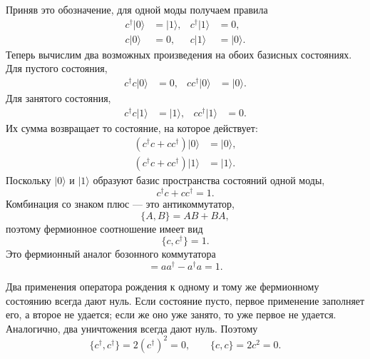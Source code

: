 Приняв это обозначение, для одной моды получаем правила
\begin{align}
c^\dagger|0\rangle&=|1\rangle,
&c^\dagger|1\rangle&=0,
\\
c|0\rangle&=0,
&c|1\rangle&=|0\rangle.
\end{align}
Теперь вычислим два возможных произведения на обоих базисных состояниях. Для пустого состояния,
\begin{align}
c^\dagger c|0\rangle&=0,
&
cc^\dagger|0\rangle&=|0\rangle.
\end{align}
Для занятого состояния,
\begin{align}
c^\dagger c|1\rangle&=|1\rangle,
&
cc^\dagger|1\rangle&=0.
\end{align}
Их сумма возвращает то состояние, на которое действует:
\begin{align}
(c^\dagger c+cc^\dagger)|0\rangle&=|0\rangle,
\\
(c^\dagger c+cc^\dagger)|1\rangle&=|1\rangle.
\end{align}
Поскольку \(|0\rangle\) и \(|1\rangle\) образуют базис пространства состояний одной моды,
\begin{equation}
c^\dagger c+cc^\dagger=1.
\end{equation}
Комбинация со знаком плюс — это антикоммутатор,
\begin{equation}
\{A,B\}=AB+BA,
\end{equation}
поэтому фермионное соотношение имеет вид
\begin{equation}
\{c,c^\dagger\}=1.
\end{equation}
Это фермионный аналог бозонного коммутатора
\begin{equation}
[a,a^\dagger]=aa^\dagger-a^\dagger a=1.
\end{equation}

Два применения оператора рождения к одному и тому же фермионному состоянию всегда дают нуль. Если состояние пусто, первое применение заполняет его, а второе не удается; если же оно уже занято, то уже первое не удается. Аналогично, два уничтожения всегда дают нуль. Поэтому
\begin{equation}
\{c^\dagger,c^\dagger\}=2(c^\dagger)^2=0,
\qquad
\{c,c\}=2c^2=0.
\end{equation}

\begin{classroomqa}
\end{classroomqa}


